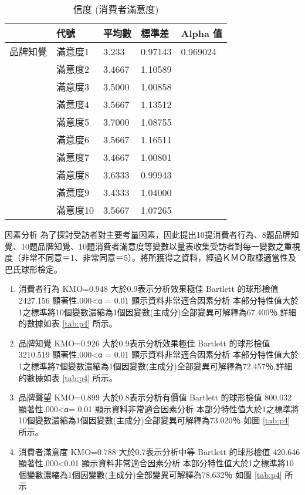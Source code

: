 \begin{table}[htb]
\caption{信度 (消費者滿意度)}
\label{tab:e4}
\renewcommand{\arraystretch}{1.2} %
\arrayrulewidth=1pt               %
\tabcolsep=18pt                   %
\begin{tabular}[t]{lllll}  %
\hline
 & 代號& 平均數 & 標準差&  Alpha 值  \\
\hline
品牌知覺 & 滿意度1&3.233&0.97143&0.969024\\
              & 滿意度2&3.4667&1.10589&  \\
             & 滿意度3&3.5000&1.00858&  \\
             & 滿意度4&3.5667&1.13512&\\
             & 滿意度5&3.7000&1.08755&  \\
             & 滿意度6&3.5667&1.16511&\\
             & 滿意度7&3.4667&1.00801&  \\
             & 滿意度8&3.6333&0.99943&  \\
             & 滿意度9&3.4333&1.04000&\\
             & 滿意度10&3.5667&1.07265&\\
\hline
\end{tabular}
\end{table}

因素分析
為了探討受訪者對主要考量因素，因此提出10提消費者行為、8題品牌知覺、10題品牌知覺、10題消費者滿意度等變數以量表收集受訪者對每一變數之重視度（非常不同意＝1、非常同意＝5）。將所獲得之資料，經過ＫＭＯ取樣適當性及巴氏球形檢定。
\begin{enumerate}
\item 消費者行為
KMO=0.948 大於0.9表示分析效果極佳 Bartlett 的球形檢值 2427.156 顯著性.000<α = 0.01 顯示資料非常適合因素分析  本部分特性值大於1之標準將10個變數濃縮為1個因變數(主成分)全部變異可解釋為67.400％,詳細的數據如表  \ref{tab:p4} 所示。
\item 品牌知覺
KMO=0.926 大於0.9表示分析效果極佳 Bartlett 的球形檢值 3210.519 顯著性.000<α = 0.01 顯示資料非常適合因素分析  本部分特性值大於1之標準將7個變數濃縮為1個因變數(主成分)全部變異可解釋為72.457％,詳細的數據如表  \ref{tab:p4} 所示。
\item 品牌聲望
KMO=0.899 大於0.8表示分析有價值 Bartlett 的球形檢值 800.032 顯著性.000<α= 0.01 顯示資料非常適合因素分析  本部分特性值大於1之標準將10個變數濃縮為1個因變數(主成分)全部變異可解釋為73.020％ 如圖 \ref{tab:p4}  所示。
\item 消費者滿意度
KMO=0.788 大於0.7表示分析中等 Bartlett 的球形檢值 420.646 顯著性.000<0.01 顯示資料非常適合因素分析  本部分特性值大於1之標準將10個變數濃縮為1個因變數(主成分)全部變異可解釋為78.632％ 如圖 \ref{tab:p4} 所示
\end{enumerate}

